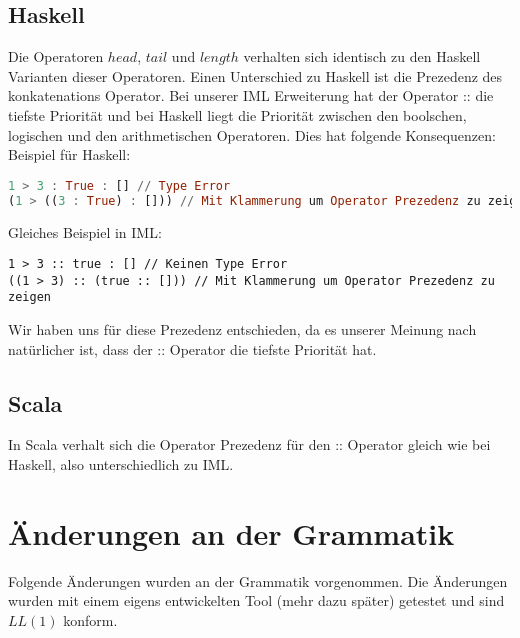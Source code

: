 \documentclass[a4paper,notitlepage,oneside]{scrartcl}
\begin{document}
\subsection{Haskell}
Die Operatoren $head$, $tail$ und $length$ verhalten sich identisch zu den Haskell Varianten dieser Operatoren. Einen Unterschied zu Haskell ist die Prezedenz des konkatenations Operator. Bei unserer IML Erweiterung hat der Operator :: die tiefste Priorität und bei Haskell liegt die Priorität zwischen den boolschen, logischen und den arithmetischen Operatoren. Dies hat folgende Konsequenzen:
\newline
\newline
Beispiel für Haskell: 

\begin{lstlisting}[language=haskell, caption=Ungültige Listen Konkatenation in Haskell]
1 > 3 : True : [] // Type Error
(1 > ((3 : True) : [])) // Mit Klammerung um Operator Prezedenz zu zeigen
\end{lstlisting}

\raggedright
Gleiches Beispiel in IML:

\begin{lstlisting}[language=iml, caption=Gültige Listen Konkatenation in IML]
1 > 3 :: true : [] // Keinen Type Error
((1 > 3) :: (true :: [])) // Mit Klammerung um Operator Prezedenz zu zeigen
\end{lstlisting}
Wir haben uns für diese Prezedenz entschieden, da es unserer Meinung nach natürlicher ist, dass der :: Operator die tiefste Priorität hat.

\subsection{Scala}
In Scala verhalt sich die Operator Prezedenz für den :: Operator gleich wie bei Haskell, also unterschiedlich zu IML.


\newpage
\section{Änderungen an der Grammatik}
Folgende Änderungen wurden an der Grammatik vorgenommen. Die Änderungen wurden mit einem eigens entwickelten Tool (mehr dazu später) getestet und sind $LL(1)$ konform.
\end{document}
